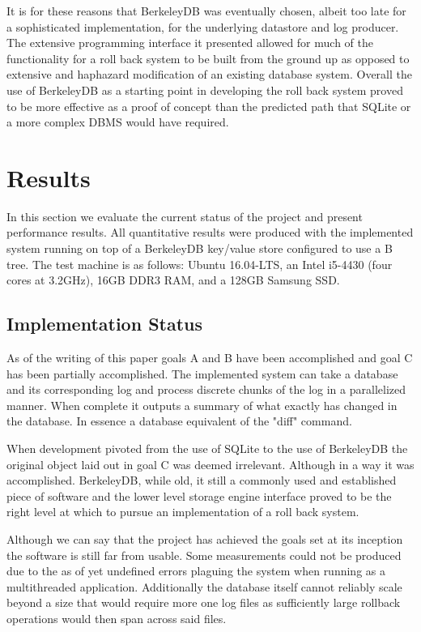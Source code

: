 \documentclass{article}
\begin{document}
It is for these reasons that BerkeleyDB was eventually chosen, albeit too late for a sophisticated implementation, for the underlying datastore and log producer. The extensive programming interface it presented allowed for much of the functionality for a roll back system to be built from the ground up as opposed to extensive and haphazard modification of an existing database system. Overall the use of BerkeleyDB as a starting point in developing the roll back system proved to be more effective as a proof of concept than the predicted path that SQLite or a more complex DBMS would have required. 

\section{Results}
In this section we evaluate the current status of the project and present performance results. All quantitative results were produced with the implemented system running on top of a BerkeleyDB key/value store configured to use a B tree. The test machine  is as follows: Ubuntu 16.04-LTS, an Intel i5-4430 (four cores at 3.2GHz), 16GB DDR3 RAM, and a 128GB Samsung SSD. 

\subsection{Implementation Status}

As of the writing of this paper goals A and B have been accomplished and goal C has been partially accomplished. The implemented system can take a database and its corresponding log and process discrete chunks of the log in a parallelized manner. When complete it outputs a summary of what exactly has changed in the database. In essence a database equivalent of the "diff" command. 

When development pivoted from the use of SQLite to the use of BerkeleyDB the original object laid out in goal C was deemed irrelevant. Although in a way it was accomplished. BerkeleyDB, while old, it still a commonly used and established piece of software and the lower level storage engine interface proved to be the right level at which to pursue an implementation of a roll back system.

Although we can say that the project has achieved the goals set at its inception the software is still far from usable. Some measurements could not be produced due to the as of yet undefined errors plaguing the system when running as a multithreaded application. Additionally the database itself cannot reliably scale beyond a size that would require more one log files as sufficiently large rollback operations would then span across said files.
\end{document}
